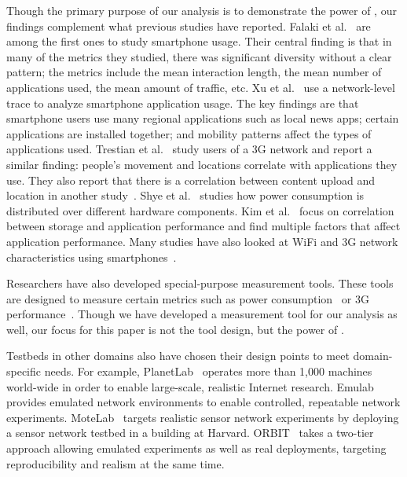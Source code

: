 Though the primary purpose of our analysis is to demonstrate the power of
\PhoneLab{}, our findings complement what previous studies have reported. Falaki
et al.~\cite{falaki:mobisys:2010} are among the first ones to study smartphone
usage. Their central finding is that in many of the metrics they studied, there
was significant diversity without a clear pattern; the metrics include the mean
interaction length, the mean number of applications used, the mean amount of
traffic, etc. Xu et al.~\cite{xu:imc:2011} use a network-level trace to analyze
smartphone application usage. The key findings are that smartphone users use
many regional applications such as local news apps; certain applications are
installed together; and mobility patterns affect the types of applications
used. Trestian et al.~\cite{trestian:imc:2009} study users of a 3G network and
report a similar finding: people's movement and locations correlate with
applications they use. They also report that there is a correlation between
content upload and location in another study~\cite{trestian:ton:2012}. Shye et
al.~\cite{shye:micro:2009} studies how power consumption is distributed over
different hardware components. Kim et al.~\cite{kim:fast:2012} focus on
correlation between storage and application performance and find multiple
factors that affect application performance. Many studies have also looked at
WiFi and 3G network characteristics using
smartphones~\cite{keralapura:mobicom:2010, maier:pam:2010, gember:pam:2011}.

Researchers have also developed special-purpose measurement tools. These tools
are designed to measure certain metrics such as power
consumption~\cite{zhang:codes:2010, pathak:eurosys:2012} or 3G
performance~\cite{huang:mobisys:2010}. Though we have developed a measurement
tool for our analysis as well, our focus for this paper is not the tool design,
but the power of \PhoneLab{}.

Testbeds in other domains also have chosen their design points to meet
domain-specific needs. For example, PlanetLab~\cite{peterson:ccr:2003,
planetlab} operates more than 1,000 machines world-wide in order to enable
large-scale, realistic Internet research. Emulab~\cite{white:osdi:2002, emulab}
provides emulated network environments to enable controlled, repeatable
network experiments. MoteLab~\cite{werner-allen:ipsn:2005} targets realistic
sensor network experiments by deploying a sensor network testbed in a building
at Harvard. ORBIT~\cite{raychaudhuri:tridentcom:2005} takes a two-tier approach
allowing emulated experiments as well as real deployments, targeting
reproducibility and realism at the same time.
